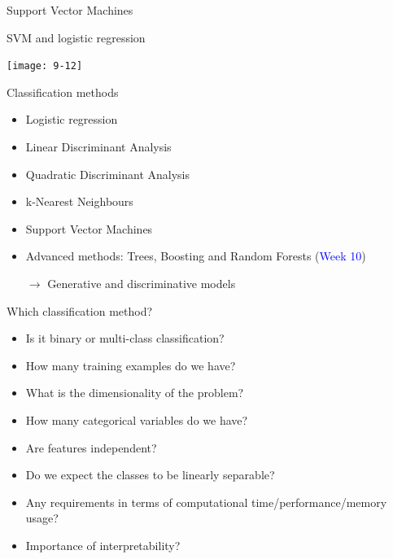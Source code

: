 \documentclass[14pt]{beamer}
\begin{document}
\begin{frame}{Support Vector Machines}




\end{frame}


\begin{frame}{SVM and logistic regression}

\vspace{-0.5cm}
\centerline{\texttt{[image: 9-12]}}


\end{frame}

\begin{frame}{Classification methods}


\begin{itemize}
	\item Logistic regression

	\item Linear Discriminant Analysis
	
	\item Quadratic Discriminant Analysis

	\item k-Nearest Neighbours

	\item Support Vector Machines

	\item Advanced methods: Trees, Boosting and Random Forests (\textcolor{blue}{Week 10})
	\item[$\rightarrow$] \alert{Generative} and \alert{discriminative}  models
\end{itemize}



\end{frame}



\begin{frame}{Which classification method?}

\begin{itemize}
	\item Is it binary or multi-class classification?
	\item How many training examples do we have?
	\item What is the dimensionality of the problem?
	\item How many categorical variables do we have?
	\item Are features independent?
	\item Do we expect the classes to be linearly separable?
	\item Any requirements in terms of computational time/performance/memory usage?
	\item Importance of interpretability?
\end{itemize}

\end{frame}
\end{document}
